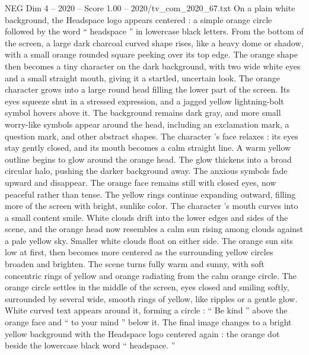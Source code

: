 \begin{textsample}{NEG Dim 4 – 2020 – Score 1.00 – 2020/tv\_com\_2020\_67.txt}  \label{ex:f4_neg_089}
On a plain white background, the Headspace logo appears centered : a simple orange circle followed by the word “ headspace ” in lowercase black letters.
From the bottom of the screen, a large dark charcoal curved shape rises, like a heavy dome or shadow, with a small orange rounded square peeking over its top edge.
The orange shape then becomes a tiny character on the dark background, with two wide white eyes and a small straight mouth, giving it a startled, uncertain look.
The orange character grows into a large round head filling the lower part of the screen.
Its eyes squeeze shut in a stressed expression, and a jagged yellow lightning-bolt symbol hovers above it.
The background remains dark gray, and more small worry-like symbols appear around the head, including an exclamation mark, a question mark, and other abstract shapes.
The character ’s face relaxes : its eyes stay gently closed, and its mouth becomes a calm straight line.
A warm yellow outline begins to glow around the orange head.
The glow thickens into a broad circular halo, pushing the darker background away.
The anxious symbols fade upward and disappear.
The orange face remains still with closed eyes, now peaceful rather than tense.
The yellow rings continue expanding outward, filling more of the screen with bright, sunlike color.
The character ’s mouth curves into a small content smile.
White clouds drift into the lower edges and sides of the scene, and the orange head now resembles a calm sun rising among clouds against a pale yellow sky.
Smaller white clouds float on either side.
The orange sun sits low at first, then becomes more centered as the surrounding yellow circles broaden and brighten.
The scene turns fully warm and sunny, with soft concentric rings of yellow and orange radiating from the calm orange circle.
The orange circle settles in the middle of the screen, eyes closed and smiling softly, surrounded by several wide, smooth rings of yellow, like ripples or a gentle glow.
White curved text appears around it, forming a circle : “ Be kind ” above the orange face and “ to your mind ” below it.
The final image changes to a bright yellow background with the Headspace logo centered again : the orange dot beside the lowercase black word “ headspace. ”

\end{textsample}
